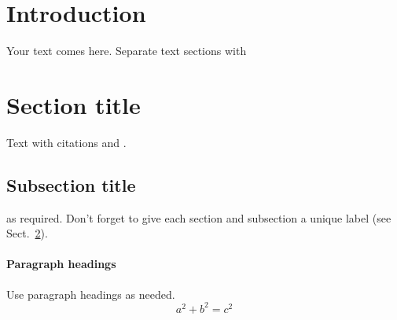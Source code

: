 \date{Received: date / Accepted: date}


\maketitle

\begin{abstract}
Insert your abstract here. Include keywords, PACS and mathematical
subject classification numbers as needed.
\end{abstract}

\section{Introduction}
\label{intro}
Your text comes here. Separate text sections with
\section{Section title}
\label{sec:1}
Text with citations \cite{RefB} and \cite{RefJ}.
\subsection{Subsection title}
\label{sec:2}
as required. Don't forget to give each section
and subsection a unique label (see Sect.~\ref{sec:1}).
\paragraph{Paragraph headings} Use paragraph headings as needed.
\begin{equation}
a^2+b^2=c^2
\end{equation}

